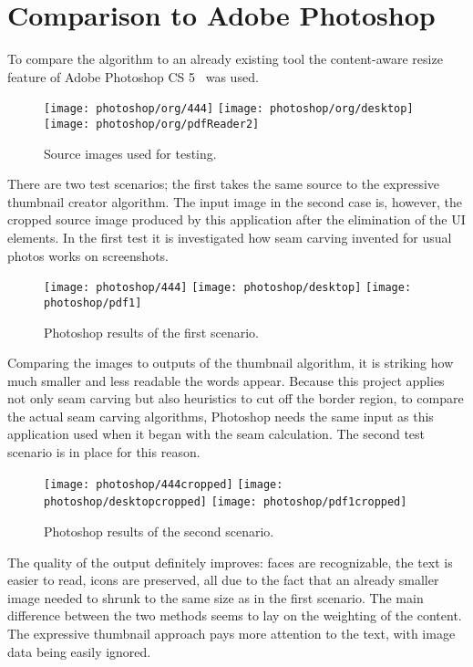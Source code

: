 \documentclass[draft,final]{vutinfth} %
\begin{document}
	\section{Comparison to Adobe Photoshop} 
	To compare the algorithm to an already existing tool the content-aware resize feature of Adobe Photoshop CS 5~\cite{photoshop} was used.
	\begin{figure}[h]
		\texttt{[image: photoshop/org/444]}\hfill
		\texttt{[image: photoshop/org/desktop]}\hfill
		\texttt{[image: photoshop/org/pdfReader2]}
		\caption{Source images used for testing.}
	\end{figure}
	There are two test scenarios; the first takes the same source to the expressive thumbnail creator algorithm.
	The input image in the second case is, however, the cropped source image produced by this application after the elimination of the UI elements.
	In the first test it is investigated how seam carving invented for usual photos works on screenshots.
	\begin{figure}[h]
		\texttt{[image: photoshop/444]}\hfill
		\texttt{[image: photoshop/desktop]}\hfill
		\texttt{[image: photoshop/pdf1]}
		\caption{Photoshop results of the first scenario.}
	\end{figure}
	Comparing  the images to outputs of the thumbnail algorithm, it is striking how much smaller and less readable the words appear.
	Because this project applies not only seam carving but also heuristics to cut off the border region, to compare the actual seam carving algorithms, Photoshop  needs the same input as this application used when it began with the seam calculation.
	The second test scenario is in place for this reason.
	\begin{figure}[h]
		\texttt{[image: photoshop/444cropped]}\hfill
		\texttt{[image: photoshop/desktopcropped]}\hfill
		\texttt{[image: photoshop/pdf1cropped]}
		\caption{Photoshop results of the second scenario.}
	\end{figure}
	The quality of the  output definitely improves: faces are recognizable, the text is easier to read, icons are preserved, all due to the fact that an already smaller image needed to shrunk to the same size as in the first scenario. 
	The main difference between the two methods seems to lay on the weighting of the content.
	The expressive thumbnail approach pays more attention to the text, with image data being easily ignored.
\end{document}
